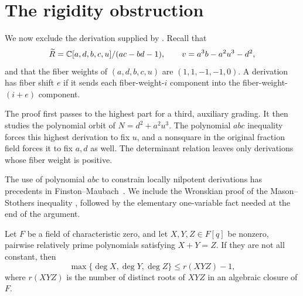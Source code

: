 \section{The rigidity obstruction}\label{sec:rigidity}

We now exclude the derivation supplied by .
Recall that
\[
 \widetilde R=\mathbb C[a,d,b,c,u]/(ac-bd-1),\qquad
 v=a^3b-a^2u^3-d^2,
\]
and that the fiber weights of $(a,d,b,c,u)$ are
$(1,1,-1,-1,0)$.  A derivation has fiber shift $e$ if it sends
each fiber-weight-$i$ component into the fiber-weight-$(i+e)$
component.

The proof first passes to the highest part for a third, auxiliary
grading. It then studies the polynomial orbit of
$N=d^2+a^2u^3$. The polynomial $abc$ inequality forces this highest
derivation to fix $u$, and a nonsquare in the original fraction field
forces it to fix $a,d$ as well. The determinant relation leaves only derivations
whose fiber weight is positive.

The use of polynomial $abc$ to constrain locally nilpotent
derivations has precedents in
Finston--Maubach~\cite[Section~2]{FinstonMaubach}. We include the
Wronskian proof of the Mason--Stothers inequality
\cite{Mason,Stothers}, followed by the elementary one-variable fact
needed at the end of the argument.

\begin{lemma}\label{rig:abc}
Let $F$ be a field of characteristic zero, and let
$X,Y,Z\in F[q]$ be nonzero, pairwise relatively prime polynomials
satisfying $X+Y=Z$.  If they are not all constant, then
\[
 \max\{\deg X,\deg Y,\deg Z\}
 \le r(XYZ)-1,
\]
where $r(XYZ)$ is the number of distinct roots of $XYZ$ in an
algebraic closure of $F$.
\end{lemma}

